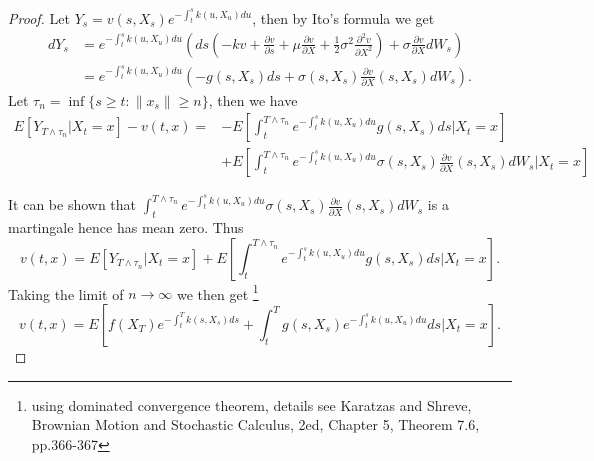 \begin{proof}
Let $Y_s=v(s,X_s) e^{-\int_t^s k(u,X_u) du}$, then by Ito's formula we get
\begin{align*}
  dY_s 
    &= e^{-\int_t^s k(u,X_u) du} 
    \left( ds (-k v + \frac{\partial v}{\partial s} 
          + \mu \frac{\partial v}{\partial X}
          + \frac{1}{2} \sigma^2 \frac{\partial^2 v}{\partial X^2} )
      + \sigma \frac{\partial v}{\partial X} dW_s \right)  \\
    &= e^{-\int_t^s k(u,X_u) du} (-g(s,X_s) ds 
        + \sigma(s,X_s) \frac{\partial v}{\partial X}(s,X_s) dW_s ).
\end{align*}
Let $\tau_n=\inf\{s\ge t: \| x_s \| \ge n\}$, then we have
\begin{align*}
  E[Y_{T\wedge \tau_n} | X_t=x] - v(t,x) = 
   &-E[\int_t^{T\wedge \tau_n} e^{-\int_t^s k(u,X_u) du} g(s,X_s) ds| X_t=x] \\
   &+E[\int_t^{T\wedge \tau_n} e^{-\int_t^s k(u,X_u) du} 
         \sigma(s,X_s) \frac{\partial v}{\partial X}(s,X_s) dW_s | X_t =x ]
\end{align*}

It can be shown that 
$\int_t^{T\wedge \tau_n} e^{-\int_t^s k(u,X_u) du} 
\sigma(s,X_s) \frac{\partial v}{\partial X}(s,X_s) dW_s$ is a martingale hence
has mean zero. Thus
\[
  v(t,x) = E[Y_{T\wedge \tau_n} | X_t=x] 
   + E[\int_t^{T\wedge \tau_n} e^{-\int_t^s k(u,X_u) du} g(s,X_s) ds| X_t=x].
\]
Taking the limit of $n\to \infty$ we then get 
\footnote{using dominated convergence theorem, details see 
  Karatzas and Shreve, Brownian Motion and Stochastic Calculus, 2ed,
  Chapter 5, Theorem 7.6, pp.366-367} 
\[
  v(t,x) = E\left[ 
              f(X_T) e^{-\int_t^T k(s,X_s) ds}  
              + \int_t^T g(s,X_s) e^{-\int_t^s k(u,X_u) du} ds \bigg| X_t = x
            \right].
\]
\end{proof}

